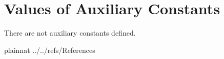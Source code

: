 \documentclass[12pt]{article}
\begin{document}



\section{Values of Auxiliary Constants}

There are not auxiliary constants defined.

%

\newpage

 {plainnat}
 {../../refs/References}

\newpage
\end{document}
